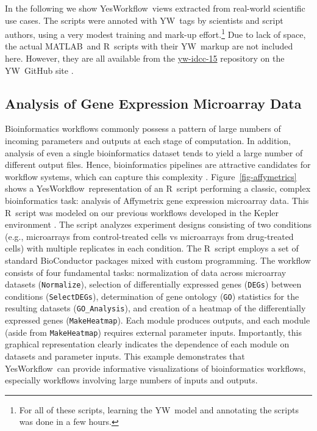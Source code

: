 \documentclass[15]{idcc}
\newcommand{\YW}{\textsf{YesWorkflow}}
\newcommand{\yw}{\textsf{YW}}
\newcommand{\ywm}[1]{\texttt{\small #1}}
\newcommand{\R}{R}
\newcommand{\MATLAB}{MATLAB}
\newcommand{\figref}[1]{Figure~\ref{#1}}
\begin{document}
 In the following we show \YW\ views extracted from real-world
 scientific use cases.  The scripts were annoted with \yw\ tags by
 scientists and script authors, using a very modest training and
 mark-up effort.\footnote{For all of these scripts, learning the \yw\
   model and annotating the scripts was done in a few hours.}  Due to
 lack of space, the actual \MATLAB\ and \R\ scripts with their \yw\
 markup are not included here. However, they are all available from
 the  \href{http://yesworkflow.org/yw-idcc-15}{yw-idcc-15} repository 
on the \yw\ GitHub site \cite{YWgithub2015}.

\subsection{Analysis of Gene Expression Microarray Data}

 Bioinformatics workflows commonly possess a pattern of large numbers
 of incoming parameters and outputs at each stage of computation. In
 addition, analysis of even a single bioinformatics dataset tends to
 yield a large number of different output files. Hence, bioinformatics
 pipelines are attractive candidates for workflow systems, which can
 capture this complexity \cite{bieda2012kepler}. \figref{fig-affymetrics}
 shows a \YW\ representation of an \R\ script performing a
 classic, complex bioinformatics task: analysis of Affymetrix gene
 expression microarray data. This \R\ script was modeled on our previous
 workflows developed in the Kepler environment \cite{stropp2012workflows}.
 The script analyzes experiment designs consisting of two conditions
 (e.g., microarrays from control-treated cells vs microarrays from
 drug-treated cells) with multiple replicates in each condition. The
 \R\ script employs a set of standard BioConductor
 \cite{gentleman2004bioconductor} packages mixed with custom programming. The
 workflow consists of four fundamental tasks: normalization of data
 across microarray datasets (\ywm{Normalize}), selection of
 differentially expressed genes (\ywm{DEGs}) between conditions
 (\ywm{SelectDEGs}), determination of gene ontology (\ywm{GO})
 statistics for the resulting datasets (\ywm{GO\_Analysis}), and
 creation of a heatmap of the differentially expressed genes
 (\ywm{MakeHeatmap}). Each module produces outputs, and each module
 (aside from \ywm{MakeHeatmap}) requires external parameter
 inputs. Importantly, this graphical representation clearly indicates
 the dependence of each module on datasets and parameter inputs. This
 example demonstrates that \YW\ can provide informative visualizations
 of bioinformatics workflows, especially workflows involving large
 numbers of inputs and outputs.
\end{document}
